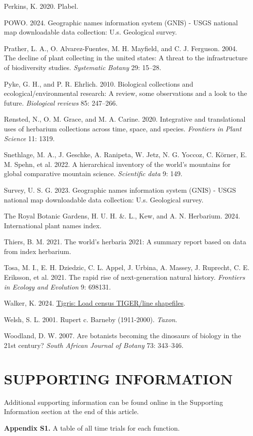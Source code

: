 \documentclass[
]{article}
\newlength{\cslhangindent}
\newenvironment{CSLReferences}[2] %
 {\begin{list}{}{%
  \setlength{\itemindent}{0pt}
  \setlength{\leftmargin}{0pt}
  \setlength{\parsep}{0pt}
  \ifodd #1
   \setlength{\leftmargin}{\cslhangindent}
   \setlength{\itemindent}{-1\cslhangindent}
  \fi
  \setlength{\itemsep}{#2\baselineskip}}}
 {\end{list}}
\begin{document}
\begin{CSLReferences}{1}{1}
Perkins, K. 2020. Plabel.

POWO. 2024. Geographic names information system (GNIS) - USGS national
map downloadable data collection: U.s. Geological survey.

Prather, L. A., O. Alvarez-Fuentes, M. H. Mayfield, and C. J. Ferguson.
2004. The decline of plant collecting in the united states: A threat to
the infrastructure of biodiversity studies. \emph{Systematic Botany} 29:
15--28.

Pyke, G. H., and P. R. Ehrlich. 2010. Biological collections and
ecological/environmental research: A review, some observations and a
look to the future. \emph{Biological reviews} 85: 247--266.

Rønsted, N., O. M. Grace, and M. A. Carine. 2020. Integrative and
translational uses of herbarium collections across time, space, and
species. \emph{Frontiers in Plant Science} 11: 1319.

Snethlage, M. A., J. Geschke, A. Ranipeta, W. Jetz, N. G. Yoccoz, C.
Körner, E. M. Spehn, et al. 2022. A hierarchical inventory of the
world's mountains for global comparative mountain science.
\emph{Scientific data} 9: 149.

Survey, U. S. G. 2023. Geographic names information system (GNIS) - USGS
national map downloadable data collection: U.s. Geological survey.

The Royal Botanic Gardens, H. U. H. \&. L., Kew, and A. N. Herbarium.
2024. International plant names index.

Thiers, B. M. 2021. The world's herbaria 2021: A summary report based on
data from index herbarium.

Tosa, M. I., E. H. Dziedzic, C. L. Appel, J. Urbina, A. Massey, J.
Ruprecht, C. E. Eriksson, et al. 2021. The rapid rise of next-generation
natural history. \emph{Frontiers in Ecology and Evolution} 9: 698131.

Walker, K. 2024.
\href{https://CRAN.R-project.org/package=tigris}{Tigris: Load census
TIGER/line shapefiles}.

Welsh, S. L. 2001. Rupert c. Barneby (1911-2000). \emph{Taxon}.

Woodland, D. W. 2007. Are botanists becoming the dinosaurs of biology in
the 21st century? \emph{South African Journal of Botany} 73: 343--346.

\end{CSLReferences}

\section{SUPPORTING INFORMATION}\label{supporting-information}

Additional supporting information can be found online in the Supporting
Information section at the end of this article.

\textbf{Appendix S1.} A table of all time trials for each function.
\end{document}
